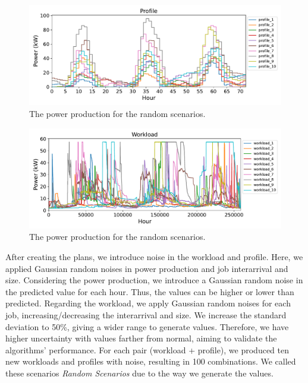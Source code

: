 \begin{figure}[!htb]
    \centering
    \includegraphics[scale=0.58]{Images/Compensations/diff_power_production.pdf}
    \caption{The power production for the random scenarios.}
    \label{fig:average_weather_with_noise}
\end{figure}

\begin{figure}[!htb]
    \centering
    \includegraphics[scale=0.58]{Images/Compensations/diff_jobs_arriving.pdf}
    \caption{The power production for the random scenarios.}
    \label{fig:average_workload_with_noise}
\end{figure}

After creating the plans, we introduce noise in the workload and profile. Here, we applied Gaussian random noises in power production and job interarrival and size. Considering the power production, we introduce a Gaussian random noise in the predicted value for each hour. Thus, the values can be higher or lower than predicted. Regarding the workload, we apply Gaussian random noises for each job, increasing/decreasing the interarrival and size. We increase the standard deviation to 50\%, giving a wider range to generate values. Therefore, we have higher uncertainty with values farther from normal, aiming to validate the algorithms' performance. For each pair (workload + profile), we produced ten new workloads and profiles with noise, resulting in 100 combinations. We called these scenarios \emph{Random Scenarios} due to the way we generate the values.

